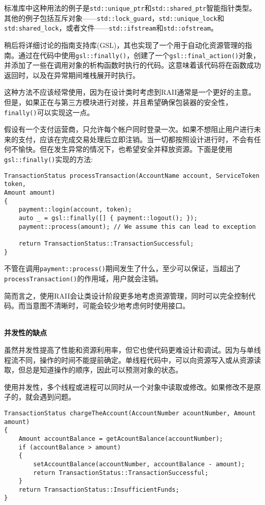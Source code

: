 标准库中这种用法的例子是\texttt{std::unique\_ptr}和\texttt{std::shared\_ptr}智能指针类型。其他的例子包括互斥对象——\texttt{std::lock\_guard}，\texttt{std::unique\_lock}和\texttt{std:shared\_lock}，或者文件——\texttt{std::ifstream}和\texttt{std::ofstream}。

稍后将详细讨论的指南支持库(GSL)，其也实现了一个用于自动化资源管理的指南。通过在代码中使用\texttt{gsl::finally()}，创建了一个\texttt{gsl::final\_action()}对象，并添加了一些在调用对象的析构函数时执行的代码。这意味着该代码将在函数成功返回时，以及在异常期间堆栈展开时执行。

这种方法不应该经常使用，因为在设计类时考虑到RAII通常是一个更好的主意。但是，如果正在与第三方模块进行对接，并且希望确保包装器的安全性，\texttt{finally()}可以实现这一点。

假设有一个支付运营商，只允许每个帐户同时登录一次。如果不想阻止用户进行未来的支付，应该在完成交易处理后立即注销。当一切都按照设计进行时，不会有任何不愉快。但在发生异常的情况下，也希望安全并释放资源。下面是使用\texttt{gsl::finally()}实现的方法:

\begin{lstlisting}[style=styleCXX]
TransactionStatus processTransaction(AccountName account, ServiceToken
token,
Amount amount)
{
	payment::login(account, token);
	auto _ = gsl::finally([] { payment::logout(); });
	payment::process(amount); // We assume this can lead to exception
	
	return TransactionStatus::TransactionSuccessful;
}
\end{lstlisting}

不管在调用\texttt{payment::process()}期间发生了什么，至少可以保证，当超出了\texttt{processTransaction()}的作用域，用户就会注销。

简而言之，使用RAII会让类设计阶段更多地考虑资源管理，同时可以完全控制代码。而当意图不清晰时，可能会较少地考虑何时使用接口。

\hspace*{\fill} \\ %
\noindent
\textbf{并发性的缺点}

虽然并发性提高了性能和资源利用率，但它也使代码更难设计和调试。因为与单线程流不同，操作的时间不能提前确定。单线程代码中，可以向资源写入或从资源读取，但总是知道操作的顺序，因此可以预测对象的状态。

使用并发性，多个线程或进程可以同时从一个对象中读取或修改。如果修改不是原子的，就会遇到问题。

\begin{lstlisting}[style=styleCXX]
TransactionStatus chargeTheAccount(AccountNumber acountNumber, Amount
amount)
{
	Amount accountBalance = getAcountBalance(accountNumber);
	if (accountBalance > amount)
	{
		setAccountBalance(accountNumber, accountBalance - amount);
		return TransactionStatus::TransactionSuccessful;
	}
	return TransactionStatus::InsufficientFunds;
}
\end{lstlisting}

